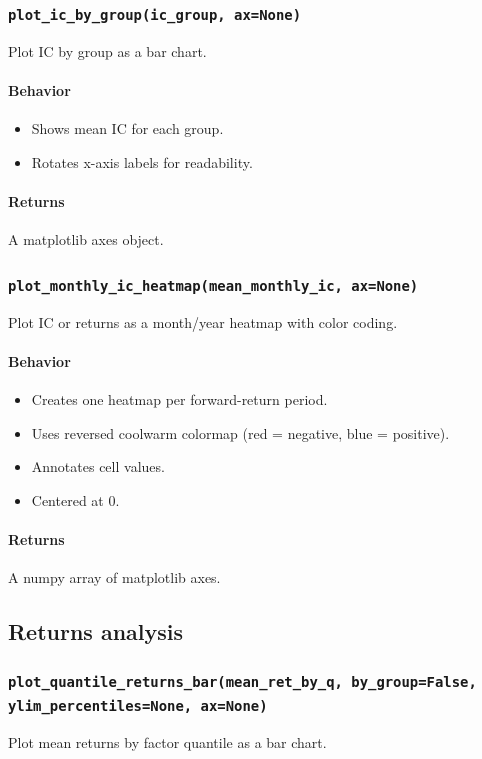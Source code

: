 \documentclass[11pt]{article}
\begin{document}
\subsubsection{\texttt{plot\_ic\_by\_group(ic\_group, ax=None)}}
Plot IC by group as a bar chart.

\paragraph{Behavior}
\begin{itemize}
  \item Shows mean IC for each group.
  \item Rotates x-axis labels for readability.
\end{itemize}

\paragraph{Returns}
A matplotlib axes object.

\subsubsection{\texttt{plot\_monthly\_ic\_heatmap(mean\_monthly\_ic, ax=None)}}
Plot IC or returns as a month/year heatmap with color coding.

\paragraph{Behavior}
\begin{itemize}
  \item Creates one heatmap per forward-return period.
  \item Uses reversed coolwarm colormap (red = negative, blue = positive).
  \item Annotates cell values.
  \item Centered at 0.
\end{itemize}

\paragraph{Returns}
A numpy array of matplotlib axes.

\subsection{Returns analysis}

\subsubsection{\texttt{plot\_quantile\_returns\_bar(mean\_ret\_by\_q, by\_group=False, ylim\_percentiles=None, ax=None)}}
Plot mean returns by factor quantile as a bar chart.
\end{document}
